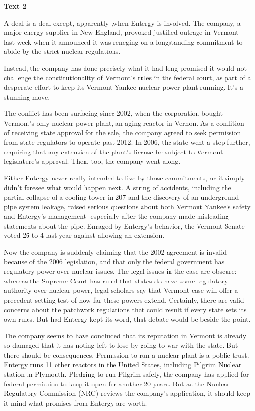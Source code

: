 \textbf{Text 2}

A deal is a deal-except, apparently ,when Entergy is involved. The company, a major energy supplier in New England, provoked justified outrage in Vermont last week when it announced it was reneging on a longstanding commitment to abide by the strict nuclear regulations.

Instead, the company has done precisely what it had long promised it would not challenge the constitutionality of Vermont’s rules in the federal court, as part of a desperate effort to keep its Vermont Yankee nuclear power plant running. It’s a stunning move.

The conflict has been surfacing since 2002, when the corporation bought Vermont’s only nuclear power plant, an aging reactor in Vernon. As a condition of receiving state approval for the sale, the company agreed to seek permission from state regulators to operate past 2012. In 2006, the state went a step further, requiring that any extension of the plant’s license be subject to Vermont legislature’s approval. Then, too, the company went along.

Either Entergy never really intended to live by those commitments, or it simply didn’t foresee what would happen next. A string of accidents, including the partial collapse of a cooling tower in 207 and the discovery of an underground pipe system leakage, raised serious questions about both Vermont Yankee’s safety and Entergy’s management- especially after the company made misleading statements about the pipe. Enraged by Entergy’s behavior, the Vermont Senate voted 26 to 4 last year against allowing an extension.

Now the company is suddenly claiming that the 2002 agreement is invalid because of the 2006 legislation, and that only the federal government has regulatory power over nuclear issues. The legal issues in the case are obscure: whereas the Supreme Court has ruled that states do have some regulatory authority over nuclear power, legal scholars say that Vermont case will offer a precedent-setting test of how far those powers extend. Certainly, there are valid concerns about the patchwork regulations that could result if every state sets its own rules. But had Entergy kept its word, that debate would be beside the point.

The company seems to have concluded that its reputation in Vermont is already so damaged that it has noting left to lose by going to war with the state. But there should be consequences. Permission to run a nuclear plant is a poblic trust. Entergy runs 11 other reactors in the United States, including Pilgrim Nuclear station in Plymouth. Pledging to run Pilgrim safely, the company has applied for federal permission to keep it open for another 20 years. But as the Nuclear Regulatory Commission (NRC) reviews the company’s application, it should keep it mind what promises from Entergy are worth.

